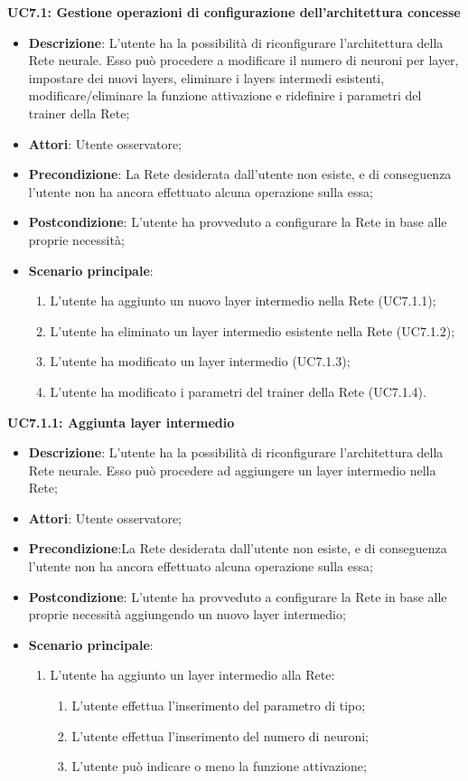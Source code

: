 \textbf{UC7.1: Gestione operazioni di configurazione dell'architettura concesse}
\label{UC7.1: Gestione operazioni di configurazione dell'architettura concesse}
\noindent
\begin{itemize}
\item \textbf{Descrizione}: L'utente ha la possibilit\`a di riconfigurare l'architettura della Rete neurale. Esso pu\`o procedere a modificare il numero di neuroni per layer, impostare dei nuovi layers, eliminare i layers intermedi esistenti, modificare/eliminare la funzione attivazione e ridefinire i parametri del trainer della Rete;
\item \textbf{Attori}: Utente osservatore;
\item \textbf{Precondizione}: La Rete desiderata dall'utente non esiste, e di conseguenza l'utente non ha ancora effettuato alcuna operazione sulla essa;
\item \textbf{Postcondizione}: L'utente ha provveduto a configurare la Rete in base alle proprie necessit\`a;
\item \textbf{Scenario principale}:
\begin{enumerate}
\item L'utente ha aggiunto un nuovo layer intermedio nella Rete (UC7.1.1);
\item L'utente ha eliminato un layer intermedio esistente nella Rete (UC7.1.2);
\item L'utente ha modificato un layer intermedio (UC7.1.3);
\item L'utente ha modificato i parametri del trainer della Rete (UC7.1.4).
\end{enumerate}
\end{itemize}

\textbf{UC7.1.1: Aggiunta layer intermedio}
\label{UC7.1.1: Aggiunta layer intemrdio}
\noindent
\begin{itemize}
\item \textbf{Descrizione}: L'utente ha la possibilit\`a di riconfigurare l'architettura della Rete neurale. Esso pu\`o procedere ad aggiungere un layer intermedio nella Rete;
\item \textbf{Attori}: Utente osservatore;
\item \textbf{Precondizione}:La Rete desiderata dall'utente non esiste, e di conseguenza l'utente non ha ancora effettuato alcuna operazione sulla essa;
\item \textbf{Postcondizione}: L'utente ha provveduto a configurare la Rete in base alle proprie necessit\`a aggiungendo un nuovo layer intermedio;
\item \textbf{Scenario principale}:
\begin{enumerate}
\item L'utente ha aggiunto un layer intermedio alla Rete:
\begin{enumerate}
\item L'utente effettua l'inserimento del parametro di tipo;
\item L'utente effettua l'inserimento del numero di neuroni;
\item L'utente pu\`o indicare o meno la funzione attivazione;
\end{enumerate}
\end{enumerate}
\end{itemize}

